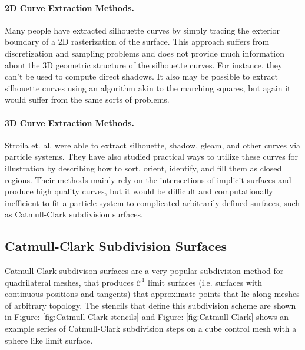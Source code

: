 \documentclass[12pt, letterpaper]{article}
\begin{document}
	\paragraph{2D Curve Extraction Methods.}

		Many people have extracted silhouette curves by simply tracing the exterior boundary of a 2D rasterization of the surface. This approach suffers from 
		discretization and sampling problems and does not provide much information about the 3D geometric structure of the silhouette curves.
		For instance, they can't be used to compute direct shadows.
		It also may be possible to extract silhouette curves using an algorithm akin to the marching squares, but again it would suffer from the same sorts of problems.
	
	\paragraph{3D Curve Extraction Methods.}

	Stroila et. al. were able to extract silhouette, shadow, gleam, and other curves via particle systems. They have also studied practical ways to utilize these curves
	for illustration by describing how to sort, orient, identify, and fill them as closed regions. \cite{SEH08}
	Their methods mainly rely on the intersections of implicit surfaces and produce high quality curves, but it would be difficult and computationally
	inefficient to fit a particle system to complicated arbitrarily defined surfaces, such as Catmull-Clark subdivision surfaces.
	
	\subsection{Catmull-Clark Subdivision Surfaces}

		Catmull-Clark subdivison surfaces are a very popular subdivision method for quadrilateral meshes, that produces $\mathcal{C}^{1}$
		limit surfaces (i.e. surfaces with continuous positions and tangents) that approximate points that lie along meshes of arbitrary topology. \cite{Catmull98}
		The stencils that define this subdivision scheme are shown in Figure: \ref{fig:Catmull-Clark-stencils} and Figure: \ref{fig:Catmull-Clark}
		shows an example series of Catmull-Clark subdivision steps on a cube control mesh with a sphere like limit surface.
\end{document}
